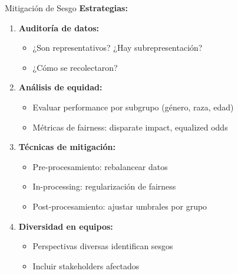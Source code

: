 \documentclass[aspectratio=169]{beamer}
\begin{document}
\begin{frame}{Mitigación de Sesgo}
\textbf{Estrategias:}

\begin{enumerate}
\item \textbf{Auditoría de datos:}
\begin{itemize}
\item ¿Son representativos? ¿Hay subrepresentación?
\item ¿Cómo se recolectaron?
\end{itemize}

\item \textbf{Análisis de equidad:}
\begin{itemize}
\item Evaluar performance por subgrupo (género, raza, edad)
\item Métricas de fairness: disparate impact, equalized odds
\end{itemize}

\item \textbf{Técnicas de mitigación:}
\begin{itemize}
\item Pre-procesamiento: rebalancear datos
\item In-processing: regularización de fairness
\item Post-procesamiento: ajustar umbrales por grupo
\end{itemize}

\item \textbf{Diversidad en equipos:}
\begin{itemize}
\item Perspectivas diversas identifican sesgos
\item Incluir stakeholders afectados
\end{itemize}
\end{enumerate}
\end{frame}
\end{document}

